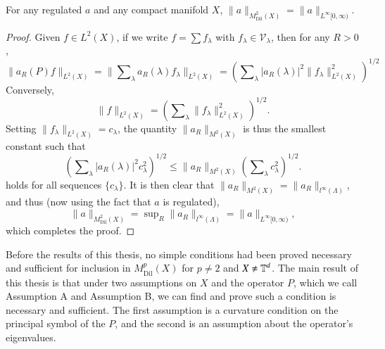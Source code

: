\begin{lemma} \label{L2M2Lemma}
  For any regulated $a$ and any compact manifold $X$, $\| a \|_{M^2_{\text{Dil}}(X)} = \| a \|_{L^\infty[0,\infty)}$.
\end{lemma}
\begin{proof}
  Given $f \in L^2(X)$, if we write $f = \sum f_\lambda$ with $f_\lambda \in \mathcal{V}_\lambda$, then for any $R > 0$,
  \begin{equation}
    \| a_R(P) f \|_{L^2(X)} = \big\| \sum\nolimits_\lambda a_R(\lambda) f_\lambda \big\|_{L^2(X)} = \left( \sum\nolimits_\lambda |a_R(\lambda)|^2 \| f_\lambda \|_{L^2(X)}^2 \right)^{1/2}
  \end{equation}
  Conversely,
  \begin{equation}
    \| f \|_{L^2(X)} = \left( \sum\nolimits_\lambda \| f_\lambda \|_{L^2(X)}^2 \right)^{1/2}.
  \end{equation}
  Setting $\| f_\lambda \|_{L^2(X)} = c_\lambda$, the quantity $\| a_R \|_{M^2(X)}$ is thus the smallest constant such that
  \begin{equation}
    \left( \sum\nolimits_\lambda |a_R(\lambda)|^2 c_\lambda^2 \right)^{1/2} \leq \| a_R \|_{M^2(X)} \left( \sum\nolimits_\lambda c_\lambda^2 \right)^{1/2}.
  \end{equation}
  holds for all sequences $\{ c_\lambda \}$. It is then clear that $\| a_R \|_{M^2(X)} = \| a_R \|_{l^\infty(\Lambda)}$, and thus (now using the fact that $a$ is regulated),
  \begin{equation}
    \| a \|_{M^2_{\text{Dil}}(X)} = \sup\nolimits_R \| a_R \|_{l^\infty(\Lambda)} = \| a \|_{L^\infty[0,\infty)},
  \end{equation}
  which completes the proof.
\end{proof}

Before the results of this thesis, no simple conditions had been proved necessary and sufficient for inclusion in $M^p_{\text{Dil}}(X)$ for $p \neq 2$ and $X \neq \operatorname{\mathbb{T}}^d$. The main result of this thesis is that under two assumptions on $X$ and the operator $P$, which we call Assumption A and Assumption B, we can find and prove such a condition is necessary and sufficient. The first assumption is a curvature condition on the principal symbol of the $P$, and the second is an assumption about the operator's eigenvalues.

\vspace{0.5em}
\noindent {}

